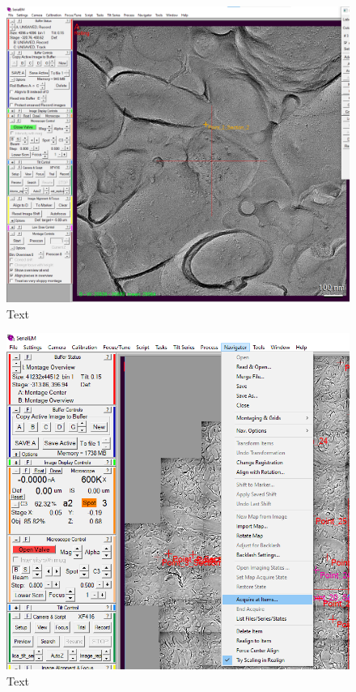\documentclass[12pt, a4paper]{scrartcl}
\begin{document}
\begin{figure}[H]
\includegraphics[width=\linewidth]{screenshots/SynapseInCenter.png}
\caption{Text}
\end{figure}

\begin{figure}[H]
\includegraphics[width=\linewidth]{screenshots/AcquireAtItems.png}
\caption{Text}
\end{figure}
\end{document}

